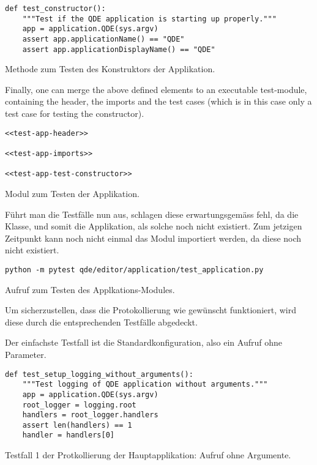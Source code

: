 \documentclass[10pt, openright, notitlepage]{scrreprt}
\begin{document}
\begin{listing}[H]
\begin{verbatim}
def test_constructor():
    """Test if the QDE application is starting up properly."""
    app = application.QDE(sys.argv)
    assert app.applicationName() == "QDE"
    assert app.applicationDisplayName() == "QDE"
\end{verbatim}
\caption{\label{orgf829b7c}
Methode zum Testen des Konstruktors der Applikation.}
\end{listing}

Finally, one can merge the above defined elements to an executable test-module,
containing the header, the imports and the test cases (which is in this case
only a test case for testing the constructor).

\begin{listing}[H]
\begin{verbatim}
<<test-app-header>>

<<test-app-imports>>

<<test-app-test-constructor>>
\end{verbatim}
\caption{Modul zum Testen der Applikation.}
\end{listing}

Führt man die Testfälle nun aus, schlagen diese erwartungsgemäss fehl, da die
Klasse, und somit die Applikation, als solche noch nicht existiert. Zum jetzigen
Zeitpunkt kann noch nicht einmal das Modul importiert werden, da diese noch
nicht existiert.

\begin{listing}[H]
\begin{verbatim}
python -m pytest qde/editor/application/test_application.py
\end{verbatim}
\caption{Aufruf zum Testen des Applkations-Modules.}
\end{listing}

Um sicherzustellen, dass die Protokollierung wie gewünscht funktioniert, wird
diese durch die entsprechenden Testfälle abgedeckt.

Der einfachste Testfall ist die Standardkonfiguration, also ein Aufruf ohne
Parameter.

\begin{listing}[H]
\begin{verbatim}
def test_setup_logging_without_arguments():
    """Test logging of QDE application without arguments."""
    app = application.QDE(sys.argv)
    root_logger = logging.root
    handlers = root_logger.handlers
    assert len(handlers) == 1
    handler = handlers[0]
\end{verbatim}
\caption{\label{org5dd740c}
Testfall 1 der Protkollierung der Hauptapplikation: Aufruf ohne Argumente.}
\end{listing}
\end{document}
